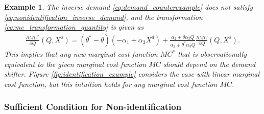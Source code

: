 \documentclass[11pt, a4paper]{article}
\newtheorem{example}{Example}
\theoremstyle{remark}
\begin{document}
\begin{example}\label{example:linear_demand}
    The inverse demand \eqref{eq:demand_counterexample} does not satisfy \eqref{eq:nonidentification_inverse_demand}, and the transformation \eqref{eq:mc_transformation_quantity} is given as
    \begin{align}
        \frac{\partial MC^{*}}{\partial Q}(Q, X^{s}) = (\theta^{*} - \theta)(-\alpha_1 + \alpha_3X^{d}) +  \frac{\alpha_2 + \theta\alpha_3Q}{\alpha_2 + \theta^{*}\alpha_3Q}\frac{\partial MC}{\partial Q}(Q, X^{s}).
    \end{align}
    This implies that any new marginal cost function $MC^{*}$ that is observationally equivalent to the given marginal cost function $MC$ should depend on the demand shifter.
    Figure \ref{fig:identification_example} considers the case with linear marginal cost function, but this intuition holds for any marginal cost function $MC$.
\end{example}


\subsubsection{Sufficient Condition for Non-identification}
\end{document}

